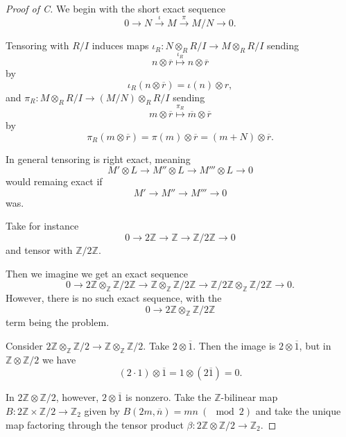 \documentclass[11pt]{article}
\begin{document}
\begin{proof}[Proof of C]
    We begin with the short exact sequence 
    \[
        0 \to N \overset\iota\to M 
        \overset\pi\to M/N \to 0. 
    \]

    Tensoring with $R/I$ induces maps 
    $\iota_R : N \otimes_R R/I \to M \otimes_R R/I$ 
    sending
    \[
        n \otimes \overline r
        \overset{\iota_R}\mapsto n \otimes \overline r  
    \]
    by 
    \[
        \iota_R(n\otimes \overline r) 
        = \iota(n) \otimes r, 
    \]
    and
    $\pi_R : M \otimes_R R/I \to (M/N) \otimes_R R/I$ sending
    \[
        m \otimes \overline r \overset{\pi_R}\mapsto 
        \overline m \otimes \overline r 
    \]
    by 
    \[
        \pi_R(m\otimes \overline r) 
        = \pi(m) \otimes \overline r 
        = (m+N) \otimes \overline r. 
    \]

    In general tensoring is right exact, meaning 
    \[
        M' \otimes L 
        \to M'' \otimes L 
        \to M''' \otimes L \to 0 
    \]
    would remaing exact if 
    \[
        M' \to M'' \to M''' \to 0 
    \]
    was. 
    
    Take for instance
    \[
        0 \to 2\mathbb Z \to \mathbb Z 
        \to \mathbb Z/2\mathbb Z \to 0
    \]
    and tensor with $\mathbb Z/2\mathbb Z$. 

    Then we imagine we get an exact sequence  
    \[
        0 \to 2 \mathbb Z \otimes_{\mathbb Z} 
        \mathbb Z/2\mathbb Z 
        \to \mathbb Z \otimes_{\mathbb Z} \mathbb Z / 
        2 \mathbb Z \to \mathbb Z/2\mathbb Z 
        \otimes_{\mathbb Z} \mathbb Z/2\mathbb Z
        \to 0. 
    \]
    However, there is no such exact sequence, 
    with the 
    \[
        0 \to 2\mathbb Z \otimes_{\mathbb Z} 
        \mathbb Z/2\mathbb Z
    \]
    term being the problem.

    Consider $2\mathbb Z \otimes_{\mathbb Z} 
    \mathbb Z/2 \to \mathbb Z \otimes_{\mathbb Z} 
    \mathbb Z/2$. 
    Take $2 \otimes \overline 1$. Then the image 
    is $2 \otimes \overline 1$, but 
    in $\mathbb Z \otimes \mathbb Z/2$ we have 
    \[
        (2\cdot 1) \otimes \overline 1 
        = 1 \otimes(2\overline 1) = 0. 
    \]

    In $2\mathbb Z \otimes \mathbb Z/2$, however, 
    $2 \otimes \overline 1$ is nonzero. 
    Take the $\mathbb Z$-bilinear map 
    $B : 2\mathbb Z \times \mathbb Z/2 \to \mathbb Z_2$ 
    given by $B(2m, \overline n) = mn \ (\mod 2)$ and 
    take the unique map factoring through 
    the tensor product $\beta : 2\mathbb Z \otimes 
    \mathbb Z/2 \to \mathbb Z_2$. 


\end{proof}
\end{document}
